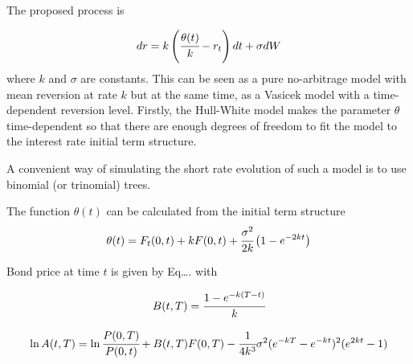 The proposed process is

\begin{equation}
dr = k\left(\cfrac{\theta(t)}{k}-r_t \right)dt + \sigma dW
\end{equation}
where \(k\) and \(\sigma\) are constants. This can be seen as a pure
no-arbitrage model with mean reversion at rate \(k\) but at the same time, 
as a Vasicek model with a time-dependent reversion level.
Firstly, the Hull-White model makes the parameter $\theta$ time-dependent
so that there are enough degrees of freedom to fit the model to the 
interest rate initial term structure.

A convenient way of simulating the short rate evolution of such a model 
is to use binomial (or trinomial) trees.



The function \(\theta(t)\) can be calculated from the initial term
structure
\[\theta(t)=F_t(0,t)+kF(0,t)+\cfrac{\sigma^2}{2k}\left(1-e^{-2kt}\right)\]

Bond price at time \(t\) is given by Eq\ldots{}.
with

\[B(t,T)=\cfrac{1-e^{-k(T-t)}}{k}\]

\[\ln A(t,T)=\ln\cfrac{P(0,T)}{P(0,t)}+B(t,T)F(0,T)-\cfrac{1}{4k^3}\sigma^{2}(e^{-kT}-e^{-kt})^2(e^{2kt}-1)\]

